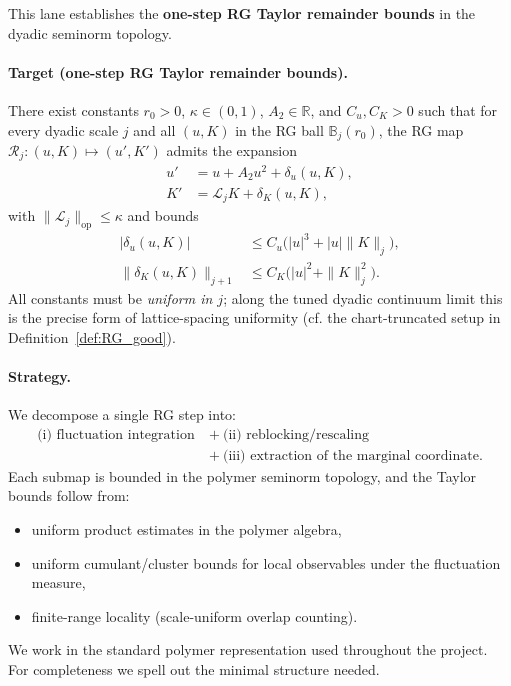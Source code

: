 This lane establishes the \textbf{one-step RG Taylor remainder bounds} in the dyadic seminorm topology.

\paragraph{Target (one-step RG Taylor remainder bounds).}
There exist constants $r_0>0$, $\kappa\in(0,1)$, $A_2\in\mathbb R$, and $C_u,C_K>0$ such that for every dyadic scale $j$
and all $(u,K)$ in the RG ball $\mathbb B_j(r_0)$,
the RG map $\mathcal R_j:(u,K)\mapsto(u',K')$ admits the expansion
\begin{align}
u'&=u+A_2 u^2+\delta_u(u,K),\label{eq:target_u}\\
K'&=\mathcal L_j K+\delta_K(u,K),\label{eq:target_K}
\end{align}
with $\|\mathcal L_j\|_{\mathrm{op}}\le\kappa$ and bounds
\begin{align}
|\delta_u(u,K)|&\le C_u\big(|u|^3+|u|\|K\|_j\big),\label{eq:target_du}\\
\|\delta_K(u,K)\|_{j+1}&\le C_K\big(|u|^2+\|K\|_j^2\big).\label{eq:target_dK}
\end{align}
All constants must be \emph{uniform in $j$}; along the tuned dyadic continuum limit this is the precise form of lattice-spacing uniformity (cf. the chart-truncated setup in Definition~\ref{def:RG_good}).

\paragraph{Strategy.}
We decompose a single RG step into:
\[
\begin{aligned}
\text{(i) fluctuation integration}\ &+\ \text{(ii) reblocking/rescaling}\\
&+\ \text{(iii) extraction of the marginal coordinate}.
\end{aligned}
\]
Each submap is bounded in the polymer seminorm topology, and the Taylor bounds follow from:
\begin{itemize}
\item uniform product estimates in the polymer algebra,
\item uniform cumulant/cluster bounds for local observables under the fluctuation measure,
\item finite-range locality (scale-uniform overlap counting).
\end{itemize}

We work in the standard polymer representation used throughout the project. For completeness we spell out the minimal structure needed.

